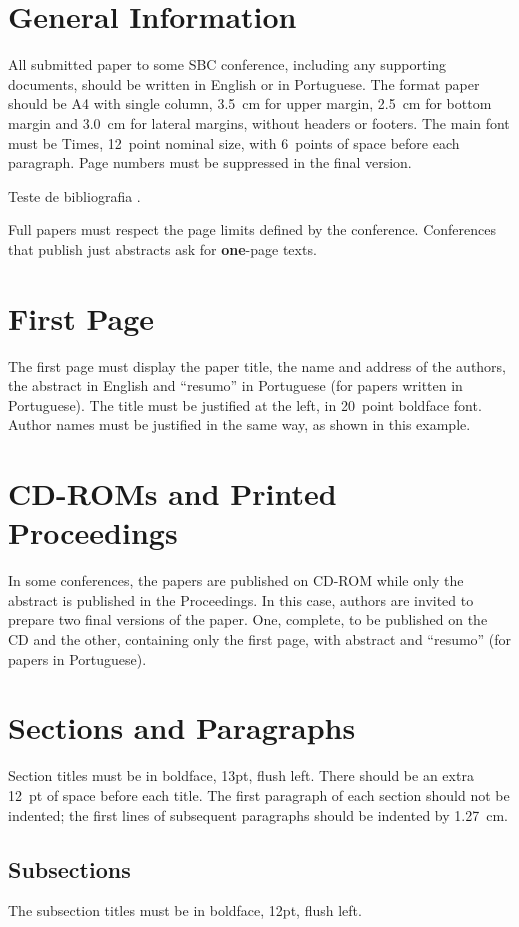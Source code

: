 \section{General Information}
All submitted paper to some SBC conference, including any supporting
documents, should be written in English or in Portuguese. The format
paper should be A4 with single column, 3.5~cm for upper margin, 2.5~cm
for bottom margin and 3.0~cm for lateral margins, without headers or
footers. The main font must be Times, 12~point nominal size, with
6~points of space before each paragraph. Page numbers must be
suppressed in the final version.

Teste de bibliografia \cite{Dean2008}.

Full papers must respect the page limits defined by the conference.
Conferences that publish just abstracts ask for \textbf{one}-page
texts.

\section{First Page}
The first page must display the paper title, the name and address of
the authors, the abstract in English and ``resumo'' in Portuguese (for
papers written in Portuguese). The title must be justified at the
left, in 20~point boldface font. Author names must be justified in the
same way, as shown in this example.

\section{CD-ROMs and Printed Proceedings}
In some conferences, the papers are published on CD-ROM while only the
abstract is published in the Proceedings. In this case, authors are
invited to prepare two final versions of the paper. One, complete, to
be published on the CD and the other, containing only the first page,
with abstract and ``resumo'' (for papers in Portuguese).

\section{Sections and Paragraphs}
Section titles must be in boldface, 13pt, flush left. There should be
an extra 12~pt of space before each title. The first paragraph of each
section should not be indented; the first lines of subsequent
paragraphs should be indented by 1.27~cm.

\subsection{Subsections}
The subsection titles must be in boldface, 12pt, flush left.

